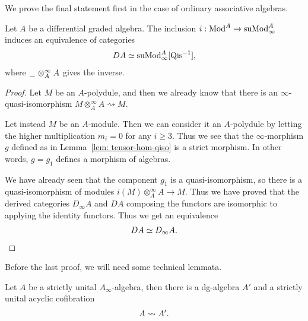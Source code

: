 \documentclass[../thesis.tex]{subfiles}
\begin{document}
            We prove the final statement first in the case of ordinary associative algebras. 

            \begin{lemma}\label{lem: derived-category-coincides}
                Let $A$ be a differential graded algebra. The inclusion $i : \tt{Mod}^A \rightarrow \tt{suMod}_\infty^A$ induces an equivalence of categories
                \begin{align*}
                    DA \simeq \tt{suMod}_\infty^A[\tt{Qis}^{-1}]\tt{,}
                \end{align*}
                where $\argument\otimes_A^\infty A$ gives the inverse.
            \end{lemma}

            \begin{proof}
                Let $M$ be an $A$-polydule, and then we already know that there is an $\infty$-quasi-isomorphism $M\otimes_A^\infty A \rightsquigarrow M$.

                Let instead $M$ be an $A$-module. Then we can consider it an $A$-polydule by letting the higher multiplication $m_i = 0$ for any $i \geq 3$. Thus we see that the $\infty$-morphism $g$ defined as in Lemma~\ref{lem: tensor-hom-qiso} is a strict morphism. In other words, $g = g_1$ defines a morphism of algebras. 
                
                We have already seen that the component $g_1$ is a quasi-isomorphism, so there is a quasi-isomorphism of modules $i(M) \otimes_A^\infty A \rightarrow M$. Thus we have proved that the derived categories $D_\infty A$ and $DA$ composing the functors are isomorphic to applying the identity functors. Thus we get an equivalence
                \begin{align*}
                    DA \simeq D_\infty A\tt{.}
                \end{align*}
            \end{proof}

            Before the last proof, we will need some technical lemmata.

            \begin{lemma}\label{lem: reverse-minimal-model}
                Let $A$ be a strictly unital $A_\infty$-algebra, then there is a dg-algebra $A'$ and a strictly unital acyclic cofibration
                \begin{align*}
                    A \rightsquigarrow A'\tt{.}
                \end{align*}
            \end{lemma}
\end{document}

